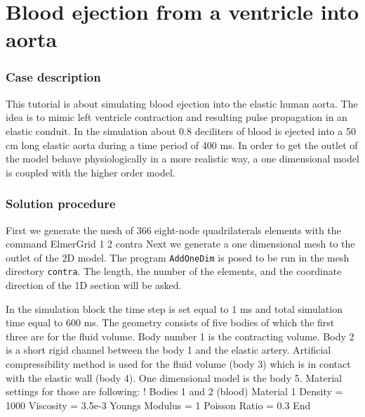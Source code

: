 \chapter{Blood ejection from a ventricle into aorta}


\subsection*{Case description}

This tutorial is about simulating blood ejection into the elastic human aorta.
The idea is to mimic left ventricle contraction and resulting pulse propagation 
in an elastic conduit. In the simulation about 0.8 
deciliters of blood is ejected into a 50 cm long elastic aorta during a time 
period of 400 ms.  In order to get the outlet of the model behave 
physiologically in a more realistic way, a one dimensional model is coupled
with the higher order model.
 
\subsection*{Solution procedure}

First we generate the mesh of 366 eight-node quadrilaterals elements with 
the command
\ttbegin
ElmerGrid 1 2 contra
\ttend
Next we generate a one dimensional mesh to the outlet of the 2D model.
The program {\tt AddOneDim} is posed to be run in the mesh directory
{\tt contra}.  The length, the number of the elements, 
and the coordinate direction of the 1D section will be asked.

In the simulation block the time step is set equal to 1 ms and 
total simulation time equal to 600 ms.  The geometry consists of five bodies
of which the first three are for the fluid volume.  Body number 1 is the 
contracting volume.  Body 2 is a short rigid channel between the body 1 and 
the elastic artery. Artificial compressibility
method is used for the fluid volume (body 3) which is in contact with the 
elastic wall (body 4).  One dimensional model is the body 5. 
Material settings for those are 
following:
\ttbegin
! Bodies 1 and 2 (blood)
Material 1
  Density = 1000
  Viscosity = 3.5e-3
  Youngs Modulus = 1
  Poisson Ratio = 0.3
End

